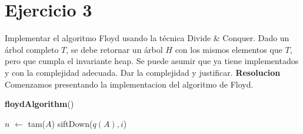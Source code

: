 \documentclass[10pt,a4paper]{article}
\begin{document}
\maketitle

\section{Ejercicio 3}

Implementar el algoritmo Floyd usando la técnica Divide \& Conquer. Dado un árbol completo $T$, se debe retornar un árbol $H$ con los mismos elementos que $T$, pero que cumpla el invariante heap. Se puede asumir que ya tiene implementados  y  con la complejidad adecuada. Dar la complejidad y justificar.
\newline
\newline
\textbf{Resolucion}
\newline
\newline
Comenzamos presentando la implementacion del algoritmo de Floyd.

\begin{algorithm}[H]{\textbf{floydAlgorithm}()}
	\begin{algorithmic}[1]
		\State $n$ $\gets$ tam($A$)                               
		\State siftDown($q(A),i$)                                    
		\EndFor
		\medskip
	\end{algorithmic}
\end{algorithm}
\end{document}
